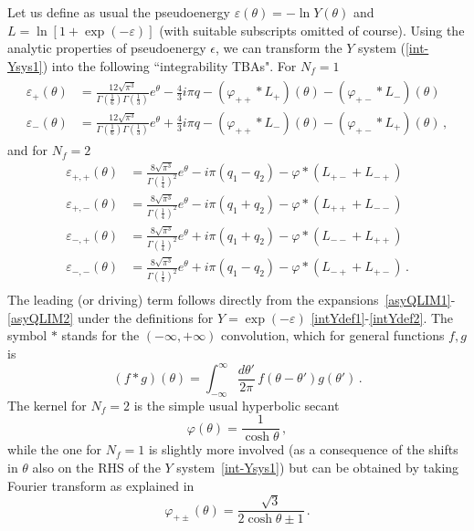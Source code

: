 \documentclass[11pt,a4paper]{elsarticle}
\def \th {\theta}
\def \ve {\varepsilon}
\def \vp {\varphi}
\def \ba {\begin{aligned}}
\def \ea {\end{aligned}}
\newcommand{\be}{\begin{equation}}
\newcommand{\ee}{\end{equation}}
\def\th{\theta}
\numberwithin{figure}{section}
\numberwithin{table}{section}
\begin{document}
Let us define as usual the pseudoenergy $\ve(\th)=-\ln Y(\th)$ and $L = \ln [1+\exp (-\ve)]$ (with suitable subscripts omitted of course). 
Using the analytic properties of pseudoenergy $\epsilon$, we can transform the $Y$ system (\ref{int-Ysys1}) into the following ``integrability TBAs". For $N_f=1$~\cite{FateevLukyanov:2005}
\begin{align} \label{int-TBA}
\begin{split}
\ve_+(\th) &= \frac{12\sqrt{ \pi ^{3}}}{\Gamma \left(\frac{1}{6}\right) \Gamma \left(\frac{1}{3}\right)}e^\theta - \frac{4}{3} i \pi q -  (\vp_{+ +}\ast L_+)(\theta) - (\vp_{+ -} \ast L_-)(\theta)\\
\ve_-(\th) &= \frac{12\sqrt{\pi ^{3}}}{\Gamma \left(\frac{1}{6}\right) \Gamma \left(\frac{1}{3}\right)}e^\theta + \frac{4}{3} i \pi q -  (\vp_{+ +}\ast L_-)(\theta) - (\vp_{+ -} \ast L_+)(\theta)\,,
\end{split}
\end{align}
and for $N_f=2$
\be
\ba 
\varepsilon_{+,+}(\th) &= \frac{8 \sqrt{\pi^3 }  }{\Gamma \left(\frac{1}{4}\right)^2}e^{\th}-i \pi (q_1-q_2)- \varphi \ast (L_{+ -}+ L_{- +}) \\
\varepsilon_{+,-}(\th) &= \frac{8 \sqrt{\pi^3 }  }{\Gamma \left(\frac{1}{4}\right)^2}e^{\th}-i \pi (q_1+q_2)- \varphi \ast (L_{+ +}+ L_{- -}) \\
\varepsilon_{-,+}(\th) &=\frac{8 \sqrt{\pi^3 }  }{\Gamma \left(\frac{1}{4}\right)^2}e^{\th}+i \pi (q_1+q_2)- \varphi \ast (L_{- -}+ L_{+ +}) \\
\varepsilon_{-,-}(\th) &= \frac{8 \sqrt{\pi^3 }  }{\Gamma \left(\frac{1}{4}\right)^2}e^{\th}+i \pi (q_1-q_2)- \varphi \ast (L_{ -+}+ L_{+- }) \,.\\
\ea  \label{int-TBA2}
\ee 
The leading (or driving) term follows directly from the expansions~\eqref{asyQLIM1}-\eqref{asyQLIM2} under the definitions for $Y= \exp( - \varepsilon)$ \eqref{intYdef1}-\eqref{intYdef2}. The symbol $\ast$ stands for the $(-\infty,+\infty)$ convolution, which for general functions $f,g$ is
\be 
(f \ast g)(\th) = \int_{-\infty}^\infty  \frac{d\th'}{2\pi}\,f(\th-\th') g(\th')\,.
\ee
The kernel for $N_f=2$ is the simple usual hyperbolic secant~\cite{Zamolodchikov:1991}
\be  \label{kernelNf2}
\varphi(\th) =   \frac{1}{\cosh \th}\,,
\ee
while the one for $N_f=1$ is slightly more involved (as a consequence of the shifts in $\th$ also on the RHS of the $Y$ system~\eqref{int-Ysys1}) but can be obtained by taking Fourier transform as explained in~\cite{FabbriFioravantiPiscagliaTateo:2013}
\be 
\vp_{+ \pm}(\th) =  \frac{\sqrt{3}}{2 \cosh \th\pm 1} \,. 
\ee 
\end{document}

